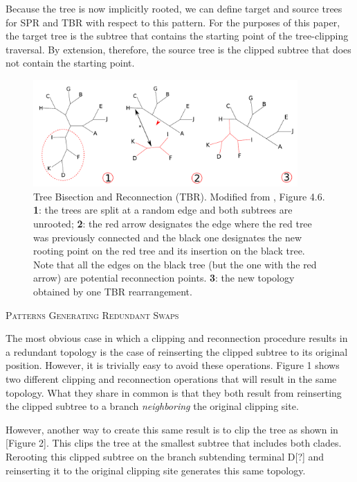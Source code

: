 \documentclass[12pt,letterpaper]{article}
\renewcommand{\section}[1]{%
\bigskip
\begin{center}
\begin{Large}
\normalfont\scshape #1
\medskip
\end{Large}
\end{center}}
\begin{document}
Because the tree is now implicitly rooted, we can define target and source trees for SPR and TBR with respect to this pattern.
For the purposes of this paper, the target tree is the subtree that contains the starting point of the tree-clipping traversal.
By extension, therefore, the source tree is the clipped subtree that does not contain the starting point.

\begin{figure}[!htbp]
\centering
   \includegraphics[width=0.9\textwidth]{Figure/TBR.pdf}
\caption{Tree Bisection and Reconnection (TBR). Modified from \cite{felsenstein2004inferring}, Figure 4.6. \textbf{1}: the trees are split at a random edge and both subtrees are unrooted; \textbf{2}: the red arrow designates the edge where the red tree was previously connected and the black one designates the new rooting point on the red tree and its insertion on the black tree. Note that all the edges on the black tree (but the one with the red arrow) are potential reconnection points. \textbf{3}: the new topology obtained by one TBR rearrangement.}
\label{Figure_TBR}
\end{figure}

\section{Patterns Generating Redundant Swaps}
The most obvious case in which a clipping and reconnection procedure results in a redundant topology is the case of reinserting the clipped subtree to its original position.
However, it is trivially easy to avoid these operations.
Figure 1 shows two different clipping and reconnection operations that will result in the same topology. 
What they share in common is that they both result from reinserting the clipped subtree to a branch \textit{neighboring} the original clipping site.

However, another way to create this same result is to clip the tree as shown in [Figure 2]. 
This clips the tree at the smallest subtree that includes both clades. %
Rerooting this clipped subtree on the branch subtending terminal D[?] and reinserting it to the original clipping site generates this same topology.
\end{document}

